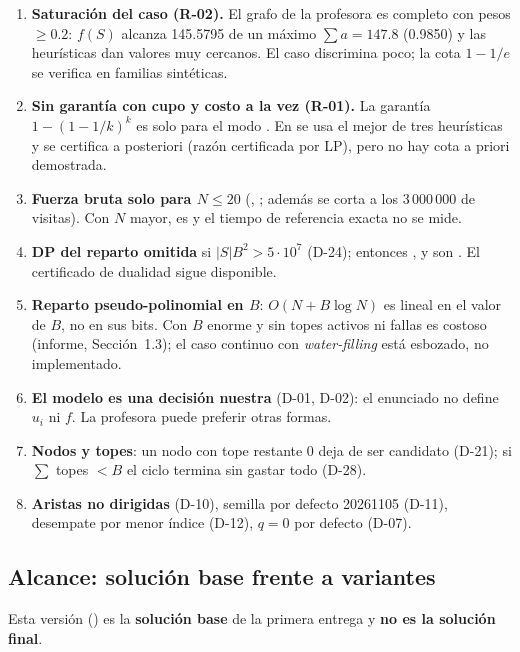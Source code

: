 \documentclass[11pt,a4paper]{article}
\begin{document}
\begin{enumerate}[leftmargin=*]
\item \textbf{Saturación del caso (R-02).} El grafo de la profesora es completo con pesos $\ge 0.2$: $f(S)$ alcanza 145.5795 de un máximo $\sum a=147.8$ (0.9850) y las heurísticas dan valores muy cercanos. El caso discrimina poco; la cota $1-1/e$ se verifica en familias sintéticas.
\item \textbf{Sin garantía con cupo y costo a la vez (R-01).} La garantía $1-(1-1/k)^k$ es solo para el modo . En  se usa el mejor de tres heurísticas y se certifica a posteriori (razón certificada por LP), pero no hay cota a priori demostrada.
\item \textbf{Fuerza bruta solo para $N\le 20$} (, ; además se corta a los 3\,000\,000 de visitas). Con $N$ mayor,  es  y el tiempo de referencia exacta no se mide.
\item \textbf{DP del reparto omitida} si $|S|B^2>5\cdot 10^{7}$ (D-24); entonces ,  y  son . El certificado de dualidad sigue disponible.
\item \textbf{Reparto pseudo-polinomial en $B$}: $O(N+B\log N)$ es lineal en el valor de $B$, no en sus bits. Con $B$ enorme y sin topes activos ni fallas es costoso (informe, Sección~1.3); el caso continuo con \emph{water-filling} está esbozado, no implementado.
\item \textbf{El modelo es una decisión nuestra} (D-01, D-02): el enunciado no define $u_i$ ni $f$. La profesora puede preferir otras formas.
\item \textbf{Nodos y topes}: un nodo con tope restante 0 deja de ser candidato (D-21); si $\sum$ topes $<B$ el ciclo termina sin gastar todo (D-28).
\item \textbf{Aristas no dirigidas} (D-10), semilla por defecto 20261105 (D-11), desempate por menor índice (D-12), $q=0$ por defecto (D-07).
\end{enumerate}

\subsection{Alcance: solución base frente a variantes}\label{sec:alcance}

Esta versión () es la \textbf{solución base} de la primera entrega y \textbf{no es la solución final}.
\end{document}

